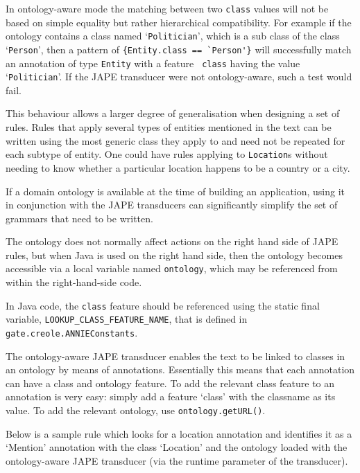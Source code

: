 {In ontology-aware mode the matching between two {\tt class} values will not
be based on simple equality but rather hierarchical compatibility. For example
if the ontology contains a class named `{\tt Politician}', which is a sub class
of the class `{\tt Person}', then a pattern of \verb!{Entity.class == `Person'}!
will successfully match an annotation of type {\tt Entity} with a feature {\tt
class} having the value `{\tt Politician}'. If the JAPE transducer were not
ontology-aware, such a test would fail. 

This behaviour allows a larger degree of generalisation when designing a set of
rules. Rules that apply several types of entities mentioned in the text can be
written using the most generic class they apply to and need not be repeated for
each subtype of entity. One could have rules applying to {\tt Location}s without
needing to know whether a particular location happens to be a country or a city.

If a domain ontology is available at the time of building an application, using
it in conjunction with the JAPE transducers can significantly simplify the set
of grammars that need to be written. 

The ontology does not normally affect actions on the right hand side of JAPE
rules, but when Java is used on the right hand side, then the ontology becomes
accessible via a local variable named {\tt ontology}, which may be referenced 
from within the right-hand-side code.

In Java code, the {\tt class} feature should be referenced using the static
final variable, {\tt LOOKUP\_CLASS\_FEATURE\_NAME}, that is defined in {\tt
gate.creole.ANNIEConstants}.


The ontology-aware JAPE transducer enables the text to be linked to classes in
an ontology by means of annotations. Essentially this means that each annotation
can have a class and ontology feature. To add the relevant class feature to an
annotation is very easy: simply add a feature `class' with the classname as its
value. To add the relevant ontology, use \texttt {ontology.getURL()}.

Below is a sample rule which looks for a location annotation and identifies it
as a `Mention' annotation with the class `Location' and the ontology loaded with
the ontology-aware JAPE transducer (via the runtime parameter of the
transducer).

}
